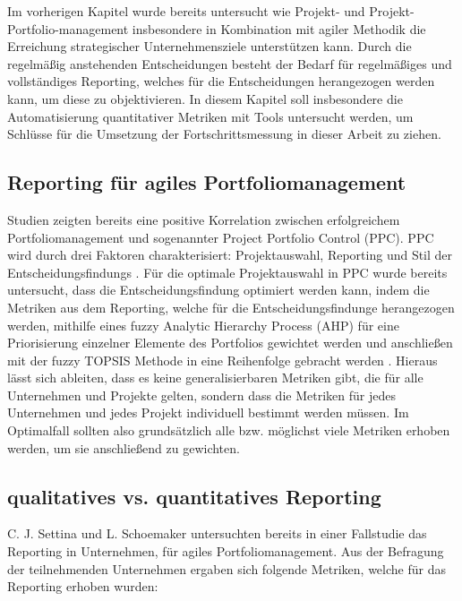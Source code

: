 Im vorherigen Kapitel wurde bereits untersucht wie Projekt- und Projekt-Portfolio-management insbesondere in Kombination mit agiler Methodik die Erreichung strategischer Unternehmensziele unterstützen kann. Durch die regelmäßig anstehenden Entscheidungen besteht der Bedarf für regelmäßiges und vollständiges Reporting, welches für die Entscheidungen herangezogen werden kann, um diese zu objektivieren. In diesem Kapitel soll insbesondere die Automatisierung quantitativer Metriken mit Tools untersucht werden, um Schlüsse für die Umsetzung der Fortschrittsmessung in dieser Arbeit zu ziehen.

\subsection{Reporting für agiles Portfoliomanagement}
Studien zeigten bereits eine positive Korrelation zwischen erfolgreichem Portfoliomanagement und sogenannter Project Portfolio Control (PPC). PPC wird durch drei Faktoren charakterisiert: Projektauswahl, Reporting und Stil der Entscheidungsfindungs \cite{ProjectPortfolioControl}.
Für die optimale Projektauswahl in PPC wurde bereits untersucht, dass die Entscheidungsfindung optimiert werden kann, indem die Metriken aus dem Reporting, welche für die Entscheidungsfindunge herangezogen werden, mithilfe eines fuzzy Analytic Hierarchy Process (AHP) für eine Priorisierung einzelner Elemente des Portfolios gewichtet werden und anschließen mit der fuzzy TOPSIS Methode in eine Reihenfolge gebracht werden \cite{Mohammed2021}.
Hieraus lässt sich ableiten, dass es keine generalisierbaren Metriken gibt, die für alle Unternehmen und Projekte gelten, sondern dass die Metriken für jedes Unternehmen und jedes Projekt individuell bestimmt werden müssen. Im Optimalfall sollten also grundsätzlich alle bzw. möglichst viele  Metriken erhoben werden, um sie anschließend zu gewichten.

\subsection{qualitatives vs. quantitatives Reporting}
C. J. Settina und L. Schoemaker \cite{reportingInAgilePortfoliomanagement} untersuchten bereits in einer Fallstudie das Reporting in Unternehmen, für agiles Portfoliomanagement. Aus der Befragung der teilnehmenden Unternehmen ergaben sich folgende Metriken, welche für das Reporting erhoben wurden:

